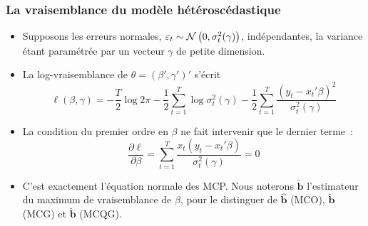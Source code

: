 \documentclass[10pt]{beamer}
\begin{document}
\begin{frame}
  \frametitle{La vraisemblance du modèle hétéroscédastique}

  \begin{itemize}

  \item Supposons les erreurs normales,
    $\varepsilon_t \sim \mathcal N\left(0,\sigma_t^2(\gamma)\right)$, indépendantes, la
    variance étant paramétrée par un vecteur $\gamma$ de petite dimension.\newline

  \item La log-vraisemblance de $\theta = (\beta', \gamma')'$ s'écrit
    \[
      \ell(\beta,\gamma) = -\frac{T}{2}\log 2\pi
      - \frac{1}{2}\sum_{t=1}^T \log\sigma_t^2(\gamma)
      - \frac{1}{2}\sum_{t=1}^T \frac{\left(y_t - x_t'\beta\right)^2}{\sigma_t^2(\gamma)}
    \]

  \item La condition du premier ordre en $\beta$ ne fait intervenir que le
    dernier terme~:
    \[
      \frac{\partial \ell}{\partial \beta} =
      \sum_{t=1}^T \frac{x_t\left(y_t - x_t'\beta\right)}{\sigma_t^2(\gamma)} = 0
    \]

  \item[$\Rightarrow$] C'est exactement l'équation normale des MCP\@. Nous
    noterons $\check{\mathbf b}$ l'estimateur du maximum de vraisemblance
    de $\beta$, pour le distinguer de $\hat{\mathbf b}$ (MCO),
    $\tilde{\mathbf b}$ (MCG) et $\breve{\mathbf b}$ (MCQG).

  \end{itemize}

\end{frame}
\end{document}

